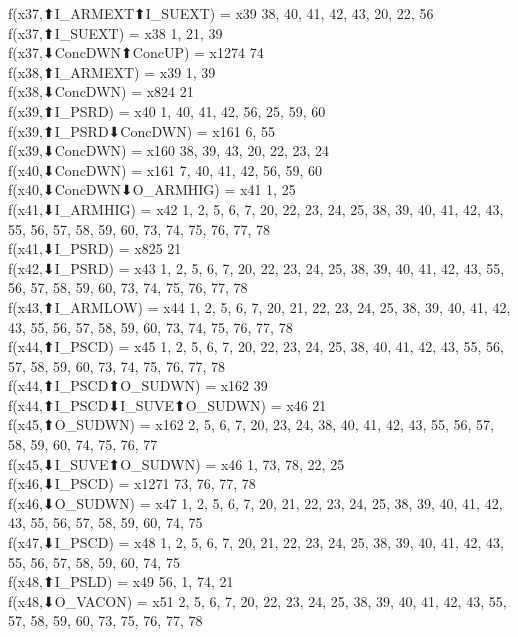 f(x37,⬆I_ARMEXT⬆I_SUEXT) = x39 {38, 40, 41, 42, 43, 20, 22, 56} \\
f(x37,⬆I_SUEXT) = x38 {1, 21, 39} \\
f(x37,⬇ConcDWN⬆ConcUP) = x1274 {74} \\
f(x38,⬆I_ARMEXT) = x39 {1, 39} \\
f(x38,⬇ConcDWN) = x824 {21} \\
f(x39,⬆I_PSRD) = x40 {1, 40, 41, 42, 56, 25, 59, 60} \\
f(x39,⬆I_PSRD⬇ConcDWN) = x161 {6, 55} \\
f(x39,⬇ConcDWN) = x160 {38, 39, 43, 20, 22, 23, 24} \\
f(x40,⬇ConcDWN) = x161 {7, 40, 41, 42, 56, 59, 60} \\
f(x40,⬇ConcDWN⬇O_ARMHIG) = x41 {1, 25} \\
f(x41,⬇I_ARMHIG) = x42 {1, 2, 5, 6, 7, 20, 22, 23, 24, 25, 38, 39, 40, 41, 42, 43, 55, 56, 57, 58, 59, 60, 73, 74, 75, 76, 77, 78} \\
f(x41,⬇I_PSRD) = x825 {21} \\
f(x42,⬇I_PSRD) = x43 {1, 2, 5, 6, 7, 20, 22, 23, 24, 25, 38, 39, 40, 41, 42, 43, 55, 56, 57, 58, 59, 60, 73, 74, 75, 76, 77, 78} \\
f(x43,⬆I_ARMLOW) = x44 {1, 2, 5, 6, 7, 20, 21, 22, 23, 24, 25, 38, 39, 40, 41, 42, 43, 55, 56, 57, 58, 59, 60, 73, 74, 75, 76, 77, 78} \\
f(x44,⬆I_PSCD) = x45 {1, 2, 5, 6, 7, 20, 22, 23, 24, 25, 38, 40, 41, 42, 43, 55, 56, 57, 58, 59, 60, 73, 74, 75, 76, 77, 78} \\
f(x44,⬆I_PSCD⬆O_SUDWN) = x162 {39} \\
f(x44,⬆I_PSCD⬇I_SUVE⬆O_SUDWN) = x46 {21} \\
f(x45,⬆O_SUDWN) = x162 {2, 5, 6, 7, 20, 23, 24, 38, 40, 41, 42, 43, 55, 56, 57, 58, 59, 60, 74, 75, 76, 77} \\
f(x45,⬇I_SUVE⬆O_SUDWN) = x46 {1, 73, 78, 22, 25} \\
f(x46,⬇I_PSCD) = x1271 {73, 76, 77, 78} \\
f(x46,⬇O_SUDWN) = x47 {1, 2, 5, 6, 7, 20, 21, 22, 23, 24, 25, 38, 39, 40, 41, 42, 43, 55, 56, 57, 58, 59, 60, 74, 75} \\
f(x47,⬇I_PSCD) = x48 {1, 2, 5, 6, 7, 20, 21, 22, 23, 24, 25, 38, 39, 40, 41, 42, 43, 55, 56, 57, 58, 59, 60, 74, 75} \\
f(x48,⬆I_PSLD) = x49 {56, 1, 74, 21} \\
f(x48,⬇O_VACON) = x51 {2, 5, 6, 7, 20, 22, 23, 24, 25, 38, 39, 40, 41, 42, 43, 55, 57, 58, 59, 60, 73, 75, 76, 77, 78} \\
